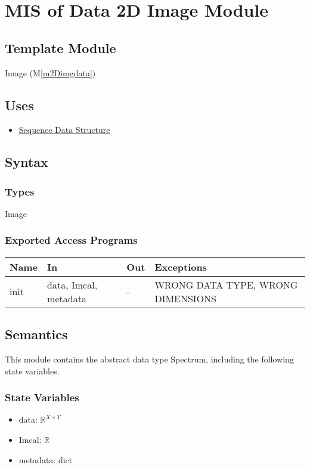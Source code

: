 \documentclass[12pt, titlepage]{article}
\newcommand{\mref}[1]{M\ref{#1}}
\begin{document}
\newpage
\section{MIS of Data 2D Image Module} \label{Mod:Image}

\subsection{Template Module}
Image (\mref{m2Dimgdata})

\subsection{Uses}
\begin{itemize}
    \item \hyperref[Mod:Seq]{Sequence Data Structure}
\end{itemize}

\subsection{Syntax}
\subsubsection{Types}
Image

\subsubsection{Exported Access Programs}

\begin{center}
    \begin{tabular}{p{1.5cm} p{4cm} p{4cm} p{4cm}}
        \toprule
        \textbf{Name} & \textbf{In} & \textbf{Out} & \textbf{Exceptions} \\
        \midrule
        init & data, Imcal, metadata & - & WRONG DATA TYPE, WRONG DIMENSIONS \\
        \bottomrule
    \end{tabular}
\end{center}

\subsection{Semantics}
This module contains the abstract data type Spectrum, including the following
state variables.
\subsubsection{State Variables}
\begin{itemize}
    \item data: $\mathbb{R}^{X \times Y}$
    \item Imcal: $\mathbb{R}$
    \item metadata: dict
\end{itemize}
\end{document}
